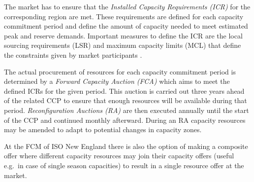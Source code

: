 The market has to ensure that the \emph{Installed Capacity Requirements (ICR)} for the corresponding region are met. These requirements are defined for each capacity commitment period and define the amount of capacity needed to meet estimated peak and reserve demands. Important measures to define the ICR are the local sourcing requirements (LSR) and maximum capacity limits (MCL) that define the constraints given by market participants \cite{gottstein2010role}. 

The actual procurement of resources for each capacity commitment period is determined by a \emph{Forward Capacity Auction (FCA)} which aims to meet the defined ICRs for the given period.
This auction is carried out three years ahead of the related CCP to ensure that enough resources will be available during that period. \emph{Reconfiguration Auctions (RA)} are then executed annually until the start of the CCP and continued monthly afterward. During an RA capacity resources may be amended to adapt to potential changes in capacity zones. 

At the FCM of ISO New England there is also the option of making a composite offer where different capacity resources may join their capacity offers (useful e.g.~in case of single season capacities) to result in a single resource offer at the market. 



%
%



